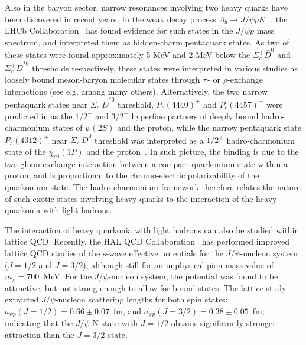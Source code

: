 \documentclass[prd,amsmath,%
twocolumn,floatfix,amssymb, preprintnumbers, linenumbers,nofootinbib, superscriptaddress]{revtex4}
\begin{document}
Also in the baryon sector, narrow resonances involving two heavy quarks have been discovered in recent years. In the weak decay process
$\Lambda_b \to J/\psi p K^-$, the LHCb Collaboration~\cite{Aaij:2015tga, Aaij:2019vzc} 
has found evidence for such states in the  $J/\psi p$ mass spectrum, and interpreted them as hidden-charm pentaquark states. 
As two of these states were found approximately 5 MeV and 2 MeV below the $\Sigma_c^+ \bar D^0$ and $\Sigma_c^+ \bar D^{\ast 0}$ thresholds respectively, these states were interpreted in various studies as loosely bound meson-baryon molecular states through $\pi$- or $\rho$-exchange interactions (see e.g. \cite{Roca:2015dva} among many others).  
Alternatively, the two narrow pentaquark states near $\Sigma_c^+ \bar D^{\ast 0}$ threshold, $P_c(4440)^+$ and $P_c(4457)^+$ were predicted in \cite{Eides:2015dtr} as the $1/2^-$ and $3/2^-$ hyperfine partners of deeply bound hadro-charmonium states of $\psi(2S)$ and the proton, while the narrow pentaquark state $P_c(4312)^+$ near $\Sigma_c^+ \bar D^0$ threshold was interpreted as a $1/2^+$ hadro-charmonium state of the $\chi_{c0}(1P)$ and the proton~\cite{Eides:2019tgv}. In such picture, the binding is due to the two-gluon exchange interaction between a compact quarkonium state within a proton, and is proportional to the chromo-electric polarizability of the quarkonium state. 
The hadro-charmonium framework therefore relates the nature of such exotic states involving heavy quarks to the interaction of the heavy quarkonia with light hadrons. 

The interaction of heavy quarkonia with light hadrons can also be studied within lattice QCD. 
Recently, the HAL QCD Collaboration~\cite{Sugiura:2019pye}  has performed improved lattice QCD studies of the s-wave effective potentials for 
the  $J/\psi$-nucleon system ($J = 1/2$ and $J = 3/2$), although still for an unphysical pion mass value of $m_\pi = 700$~MeV. For the $J/\psi$-nucleon system, the potential was found to be attractive, but not strong enough to allow for bound states. The lattice study extracted $J/\psi$-nucleon scattering lengths for both spin states: 
$a_{\psi p}(J = 1/2) = 0.66 \pm 0.07$~fm, and 
$a_{\psi p}(J = 3/2) = 0.38 \pm 0.05$~fm, indicating that the $J/\psi$-N state with 
$J = 1/2$  obtains significantly stronger attraction than the $J = 3/2$ state. 
\end{document}
